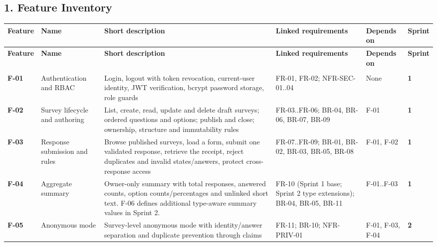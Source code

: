 \documentclass[12pt,a4paper]{article}
\begin{document}
\subsection*{1. Feature Inventory}
{\setlength{\tabcolsep}{3pt}\renewcommand{\arraystretch}{1.08}\scriptsize
\begin{longtable}{@{}>{\raggedright\arraybackslash}p{}>{\raggedright\arraybackslash}p{}>{\raggedright\arraybackslash}p{}>{\raggedright\arraybackslash}p{}>{\raggedright\arraybackslash}p{}>{\raggedright\arraybackslash}p{}@{}}
\toprule
\textbf{Feature} & \textbf{Name} & \textbf{Short description} & \textbf{Linked requirements} & \textbf{Depends on} & \textbf{Sprint} \\
\midrule
\endfirsthead
\toprule
\textbf{Feature} & \textbf{Name} & \textbf{Short description} & \textbf{Linked requirements} & \textbf{Depends on} & \textbf{Sprint} \\
\midrule
\endhead
\midrule
\multicolumn{6}{r}{\footnotesize\textit{Continued on next page}}\\
\endfoot
\bottomrule
\endlastfoot
\textbf{F-01} & Authentication and RBAC & Login, logout with token revocation, current-user identity, JWT verification, bcrypt password storage, role guards & FR-01, FR-02; NFR-SEC-01..04 & None & \textbf{1} \\
\textbf{F-02} & Survey lifecycle and authoring & List, create, read, update and delete draft surveys; ordered questions and options; publish and close; ownership, structure and immutability rules & FR-03..FR-06; BR-04, BR-06, BR-07, BR-09 & F-01 & \textbf{1} \\
\textbf{F-03} & Response submission and rules & Browse published surveys, load a form, submit one validated response, retrieve the receipt, reject duplicates and invalid states/answers, protect cross-response access & FR-07..FR-09; BR-01, BR-02, BR-03, BR-05, BR-08 & F-01, F-02 & \textbf{1} \\
\textbf{F-04} & Aggregate summary & Owner-only summary with total responses, answered counts, option counts/percentages and unlinked short text. F-06 defines additional type-aware summary values in Sprint 2. & FR-10 (Sprint 1 base; Sprint 2 type extensions); BR-04, BR-05, BR-11 & F-01..F-03 & \textbf{1} \\
\textbf{F-05} & Anonymous mode & Survey-level anonymous mode with identity/answer separation and duplicate prevention through claims & FR-11; BR-10; NFR-PRIV-01 & F-01, F-03, F-04 & \textbf{2} \\

\end{longtable}}
\end{document}
